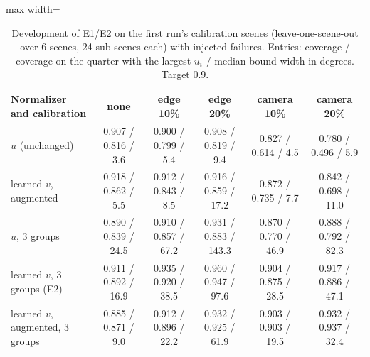 \begin{table}[!htbp]\centering\footnotesize
\caption{Development of E1/E2 on the first run's calibration scenes (leave-one-scene-out over 6 scenes, 24 sub-scenes each) with injected failures. Entries: coverage / coverage on the quarter with the largest $u_i$ / median bound width in degrees. Target 0.9.}\label{tab:s5dev}
\begin{adjustbox}{max width=\textwidth}\begin{tabular}{lccccc}\toprule
Normalizer and calibration & none & edge 10\% & edge 20\% & camera 10\% & camera 20\% \\\midrule
$u$ (unchanged) & 0.907 / 0.816 / 3.6 & 0.900 / 0.799 / 5.4 & 0.908 / 0.819 / 9.4 & 0.827 / 0.614 / 4.5 & 0.780 / 0.496 / 5.9 \\
learned $v$, augmented & 0.918 / 0.862 / 5.5 & 0.912 / 0.843 / 8.5 & 0.916 / 0.859 / 17.2 & 0.872 / 0.735 / 7.7 & 0.842 / 0.698 / 11.0 \\
$u$, 3 groups & 0.890 / 0.839 / 24.5 & 0.910 / 0.857 / 67.2 & 0.931 / 0.883 / 143.3 & 0.870 / 0.770 / 46.9 & 0.888 / 0.792 / 82.3 \\
learned $v$, 3 groups (E2) & 0.911 / 0.892 / 16.9 & 0.935 / 0.920 / 38.5 & 0.960 / 0.947 / 97.6 & 0.904 / 0.875 / 28.5 & 0.917 / 0.886 / 47.1 \\
learned $v$, augmented, 3 groups & 0.885 / 0.871 / 9.0 & 0.912 / 0.896 / 22.2 & 0.932 / 0.925 / 61.9 & 0.903 / 0.903 / 19.5 & 0.932 / 0.937 / 32.4 \\
\bottomrule\end{tabular}\end{adjustbox}\end{table}
